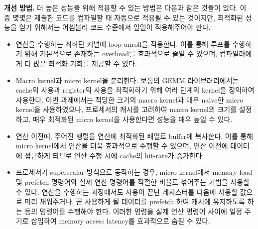 \begin{itemize}
{        \textbf{개선 방법.}
        더 높은 성능을 위해 적용할 수 있는 방법은 다음과 같은 것들이 있다. 이 중 몇몇은 제출한 코드를 컴파일할 때 
        자동으로 적용될 수 있는 것이지만, 최적화된 성능을 얻기 위해서는 어셈블리 코드 수준에서 일일이 적용해주어야 한다.
        
        \begin{itemize}
            \item {
                연산을 수행하는 최하단 커널에 loop-unroll을 적용한다. 이를 통해 루프를 수행하기 위해
                기본적으로 존재하는 overhead를 효과적으로 줄일 수 있으며, 컴파일러에게 더 많은
                최적화 기회를 제공할 수 있다.
            }
            \item {
                Macro kernel과 micro kernel을 분리한다. 보통의 GEMM 라이브러리에서는 cache의 사용과
                register의 사용을 최적화하기 위해 여러 단계의 kernel을 정의하여 사용한다.
                이번 과제에서는 적당한 크기의 macro kernel과 매우 naive한 micro kernel을
                사용하였으나, 프로세서의 캐시를 고려하여 macro kernel의 크기를 설정하고,
                매우 최적화된 micro kernel을 사용한다면 성능을 매우 높일 수 있다.
            }
            \item {
                연산 이전에, 주어진 행렬을 연산에 최적화된 배열로 buffer에 복사한다.
                이를 통해 micro kernel에서 연산을 더욱 효과적으로 수행할 수 있으며,
                연산 이전에 데이터에 접근하게 되므로 연산 수행 시에 cache의 hit-rate가 증가한다.
            }
            \item {
                프로세서가 superscalar 방식으로 동작하는 경우, micro kernel에서 memory load 및
                prefetch 명령어와 실제 연산 명령어를 적절한 비율로 섞어주는 기법을 사용할 수 있다.
                연산을 수행하는 과정에서도 사용이 끝난 레지스터를 다음에 사용할 값으로 미리 채워주거나,
                곧 사용하게 될 데이터를 prefetch 하여 캐시에 유지하도록 하는 등의 명령어를 수행해야 한다.
                이러한 명령을 실제 연산 명령어 사이에 일정 주기로 삽입하여 memory access latency를
                효과적으로 숨길 수 있다.
            }
        \end{itemize}
        
    }
    
\end{itemize}